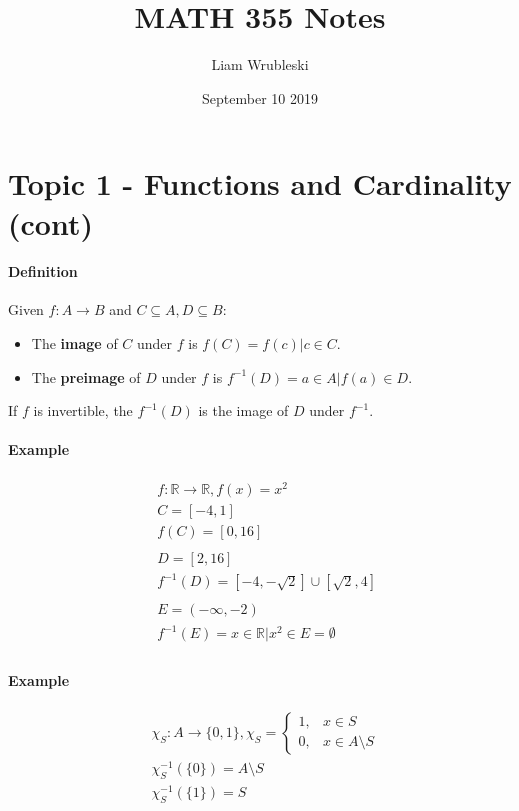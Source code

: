 \documentclass{article}
\title{MATH 355 Notes}
\author{Liam Wrubleski}
\date{September 10 2019}
\newcommand{\mapab}[2]{{#1}\xrightarrow{}{#2}}
\newcommand{\mapAB}[2]{\mathbb{#1}\xrightarrow{}\mathbb{#2}}
\begin{document}
	\maketitle
	\section{Topic 1 - Functions and Cardinality (cont)}
	\paragraph{Definition}
	Given $f:\mapab{A}{B}$ and $C\subseteq A, D\subseteq B:$
	\begin{itemize}
		\item The \textbf{image} of $C$ under $f$ is $f(C) = {f(c)|c\in C}$.\\
		\item The \textbf{preimage} of $D$ under $f$ is $f^{-1}(D) = {a\in A|f(a)\in D}$.\\
	\end{itemize}
	If $f$ is invertible, the $f^{-1}(D)$ is the image of $D$ under $f^{-1}$.
	\paragraph{Example}
	\begin{align*}
	&f:\mapAB{R}{R}, f(x) = x^2\\
	&C = [-4, 1]\\
	&f(C) = [0,16]\\~\\
	&D = [2,16]\\
	&f^{-1}(D) = [-4,-\sqrt{2}]\cup[\sqrt{2},4]\\~\\
	&E=(-\infty,-2)\\
	&f^{-1}(E) = {x\in\mathbb{R}|x^2\in E} = \emptyset\\
	\end{align*}
	\paragraph{Example}
	\begin{align*}
	&\chi_S:\mapab{A}{\{0,1\}}, \chi_S=\begin{cases}1, & x\in S\\0, & x\in A\setminus S
	\end{cases}\\
	&\chi_S^{-1}(\{0\}) = A\setminus S\\
	&\chi_S^{-1}(\{1\}) = S
	\end{align*}
\end{document}
